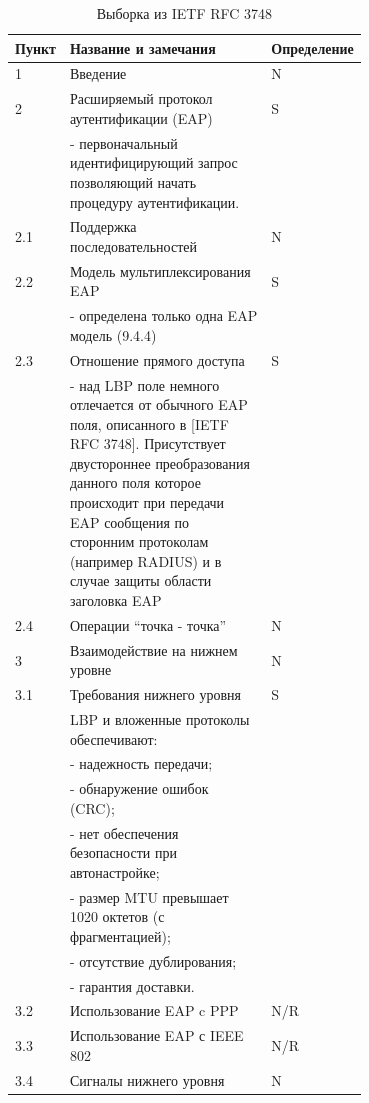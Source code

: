 \begin{longtable}{|l|p{0.7\linewidth}|l|}
  \caption{Выборка из IETF RFC 3748} \\ %
   \hline 
   Пункт & Название и замечания & Определение \\
   \hline
   1 & Введение  & N \\
   \hline
   2 & Расширяемый протокол аутентификации (EAP) & S \\ & - первоначальный идентифицирующий запрос позволяющий начать процедуру аутентификации.& \\
   \hline 
   2.1 & Поддержка последовательностей & N \\
   \hline
   2.2 & Модель мультиплексирования EAP & S \\ & - определена только одна EAP модель (9.4.4) &  \\
   \hline
   2.3 & Отношение прямого доступа & S \\ & - над LBP поле немного отлечается от обычного EAP поля, описанного в [IETF RFC 3748]. Присутствует двустороннее преобразования данного поля которое происходит при передачи EAP сообщения по сторонним протоколам (например RADIUS) и в случае защиты области заголовка EAP &  \\
   \hline
   2.4 & Операции ``точка - точка'' & N \\
   \hline
   3 & Взаимодействие на нижнем уровне & N \\
   \hline 
   3.1 & Требования нижнего уровня & S \\ & LBP и вложенные протоколы обеспечивают: & \\
    & - надежность передачи; & \\
    & - обнаружение ошибок (CRC); & \\
    & - нет обеспечения безопасности при автонастройке; & \\
    & - размер MTU превышает 1020 октетов (с фрагментацией); & \\
    & - отсутствие дублирования; & \\ 
    & - гарантия доставки. & \\
   \hline
   3.2 & Использование EAP c PPP & N/R \\
   \hline
   3.3 & Использование EAP с IEEE 802 & N/R \\
   \hline
   3.4 & Сигналы нижнего уровня & N \\

\end{longtable}
